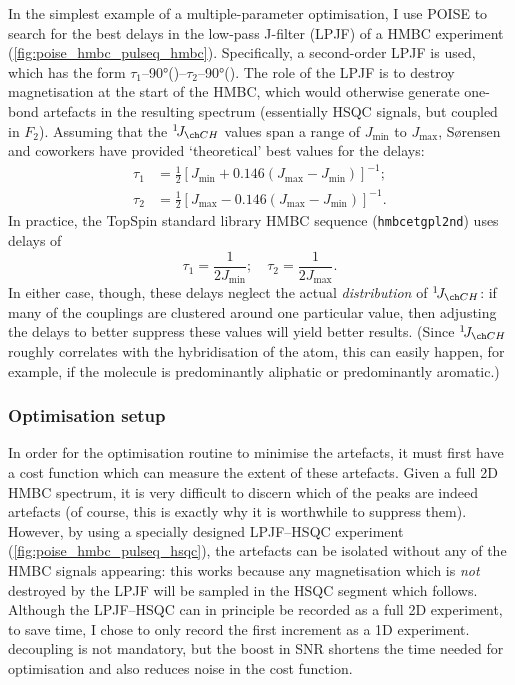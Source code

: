 In the simplest example of a multiple-parameter optimisation, I use POISE to search for the best delays in the low-pass J-filter (LPJF) of a HMBC experiment (\cref{fig:poise_hmbc_pulseq_hmbc}).
Specifically, a second-order LPJF is used, which has the form $\tau_1$--\ang{90}(\carbon{})--$\tau_2$--\ang{90}(\carbon{}).
The role of the LPJF is to destroy  magnetisation at the start of the HMBC, which would otherwise generate one-bond artefacts in the resulting spectrum (essentially HSQC signals, but coupled in $F_2$).
Assuming that the $\oneJ{CH}$ values span a range of $J_\text{min}$ to $J_\text{max}$, S{\o}rensen and coworkers have provided `theoretical' best values for the delays:\autocite{Nielsen1986JMR,Meissner2000MRC}
\begin{align}
    \tau_1 &= \frac{1}{2} [J_\text{min} + 0.146(J_\text{max} - J_\text{min})]^{-1}; \label{eq:hmbc_lpjf_theoretical_min} \\
    \tau_2 &= \frac{1}{2} [J_\text{max} - 0.146(J_\text{max} - J_\text{min})]^{-1}. \label{eq:hmbc_lpjf_theoretical_max}
\end{align}
In practice, the TopSpin standard library HMBC sequence (\texttt{hmbcetgpl2nd}) uses delays of
\begin{equation}
    \tau_1 = \frac{1}{2J_\text{min}}; \quad \tau_2 = \frac{1}{2J_\text{max}}. \label{eq:hmbc_lpjf_bruker}
\end{equation}
In either case, though, these delays neglect the actual \textit{distribution} of $\oneJ{CH}$: if many of the couplings are clustered around one particular value, then adjusting the delays to better suppress these values will yield better results.
(Since $\oneJ{CH}$ roughly correlates with the hybridisation of the \carbon{} atom,\autocite{Krivdin2018PNMRS} this can easily happen, for example, if the molecule is predominantly aliphatic or predominantly aromatic.)


\subsubsection{Optimisation setup}

In order for the optimisation routine to minimise the artefacts, it must first have a cost function which can measure the extent of these artefacts.
Given a full 2D HMBC spectrum, it is very difficult to discern which of the peaks are indeed artefacts (of course, this is exactly why it is worthwhile to suppress them).
However, by using a specially designed LPJF--HSQC experiment (\cref{fig:poise_hmbc_pulseq_hsqc}), the artefacts can be isolated without any of the HMBC signals appearing:
this works because any  magnetisation which is \textit{not} destroyed by the LPJF will be sampled in the HSQC segment which follows.
Although the LPJF--HSQC can in principle be recorded as a full 2D experiment, to save time, I chose to only record the first increment as a 1D experiment.
\carbon{} decoupling is not mandatory, but the boost in SNR shortens the time needed for optimisation and also reduces noise in the cost function.

